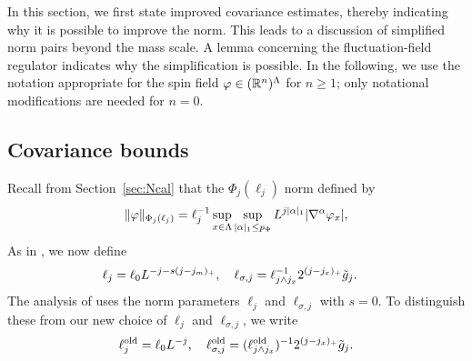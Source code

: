 In this section, we first
state improved covariance estimates, thereby indicating why it is possible
to improve the norm.
This leads to a discussion of simplified norm pairs beyond the mass
scale.  A lemma concerning the fluctuation-field regulator indicates why the
simplification is possible.
In the following, we use the notation appropriate for the spin field
$\varphi \in ({\mathbb R}^n)^\Lambda$ for $n \ge 1$; only notational modifications are needed for
$n=0$.


\subsection{Covariance bounds}
\label{sec:Cbds}

Recall from Section~\ref{sec:Ncal} that the $\Phi_j(\ell_j)$ norm defined by
\begin{equation}
\lbeq{phinorm}
\|\varphi\|_{\Phi_j(\ell_j)}
=
\ell_j^{-1}
\sup_{x\in \Lambda}
\sup_{|\alpha|_1  \le p_\Phi}
L^{j|\alpha|_1}
|\nabla^{\alpha} \varphi_x|,
\end{equation}
As in , we now define
\begin{align}
\label{e:elldef}
\ell_j &= \ell_0 L^{-j - s (j - j_m)_+}, \quad
\ell_{\sigma,j}
=
\ell_{j \wedge j_{x}}^{-1} 2^{(j - j_{x})_+} \tilde{g}_j.
\end{align}
The analysis of \cite{BS-rg-IE,BS-rg-step} uses the norm parameters $\ell_j$ and $\ell_{\sigma,j}$ with $s = 0$.
To distinguish these from our
new choice  of $\ell_j$ and $\ell_{\sigma,j}$, we write
\begin{equation}
\label{e:ell-old}
    \ell_j^{\mathrm{old}} = \ell_0 L^{-j},
    \quad
    \ell_{\sigma,j}^{\mathrm{old}}  =
    (\ell_{j \wedge j_{x}}^{\rm old})^{-1}2^{(j - j_{x})_+}\tilde{g}_j.
\end{equation}

